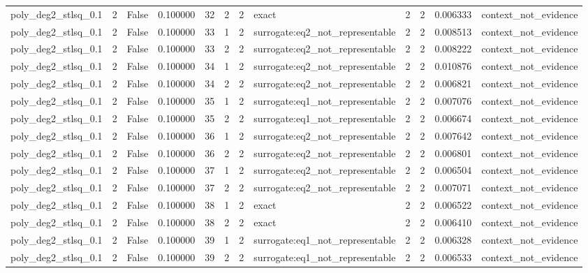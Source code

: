 \begin{tabular}{lrrrrrrlrrrl}
poly\_deg2\_stlsq\_0.1 & 2 & False & 0.100000 & 32 & 2 & 2 & exact & 2 & 2 & 0.006333 & context\_not\_evidence \\
poly\_deg2\_stlsq\_0.1 & 2 & False & 0.100000 & 33 & 1 & 2 & surrogate:eq2\_not\_representable & 2 & 2 & 0.008513 & context\_not\_evidence \\
poly\_deg2\_stlsq\_0.1 & 2 & False & 0.100000 & 33 & 2 & 2 & surrogate:eq2\_not\_representable & 2 & 2 & 0.008222 & context\_not\_evidence \\
poly\_deg2\_stlsq\_0.1 & 2 & False & 0.100000 & 34 & 1 & 2 & surrogate:eq2\_not\_representable & 2 & 2 & 0.010876 & context\_not\_evidence \\
poly\_deg2\_stlsq\_0.1 & 2 & False & 0.100000 & 34 & 2 & 2 & surrogate:eq2\_not\_representable & 2 & 2 & 0.006821 & context\_not\_evidence \\
poly\_deg2\_stlsq\_0.1 & 2 & False & 0.100000 & 35 & 1 & 2 & surrogate:eq1\_not\_representable & 2 & 2 & 0.007076 & context\_not\_evidence \\
poly\_deg2\_stlsq\_0.1 & 2 & False & 0.100000 & 35 & 2 & 2 & surrogate:eq1\_not\_representable & 2 & 2 & 0.006674 & context\_not\_evidence \\
poly\_deg2\_stlsq\_0.1 & 2 & False & 0.100000 & 36 & 1 & 2 & surrogate:eq2\_not\_representable & 2 & 2 & 0.007642 & context\_not\_evidence \\
poly\_deg2\_stlsq\_0.1 & 2 & False & 0.100000 & 36 & 2 & 2 & surrogate:eq2\_not\_representable & 2 & 2 & 0.006801 & context\_not\_evidence \\
poly\_deg2\_stlsq\_0.1 & 2 & False & 0.100000 & 37 & 1 & 2 & surrogate:eq2\_not\_representable & 2 & 2 & 0.006504 & context\_not\_evidence \\
poly\_deg2\_stlsq\_0.1 & 2 & False & 0.100000 & 37 & 2 & 2 & surrogate:eq2\_not\_representable & 2 & 2 & 0.007071 & context\_not\_evidence \\
poly\_deg2\_stlsq\_0.1 & 2 & False & 0.100000 & 38 & 1 & 2 & exact & 2 & 2 & 0.006522 & context\_not\_evidence \\
poly\_deg2\_stlsq\_0.1 & 2 & False & 0.100000 & 38 & 2 & 2 & exact & 2 & 2 & 0.006410 & context\_not\_evidence \\
poly\_deg2\_stlsq\_0.1 & 2 & False & 0.100000 & 39 & 1 & 2 & surrogate:eq1\_not\_representable & 2 & 2 & 0.006328 & context\_not\_evidence \\
poly\_deg2\_stlsq\_0.1 & 2 & False & 0.100000 & 39 & 2 & 2 & surrogate:eq1\_not\_representable & 2 & 2 & 0.006533 & context\_not\_evidence \\

\end{tabular}

